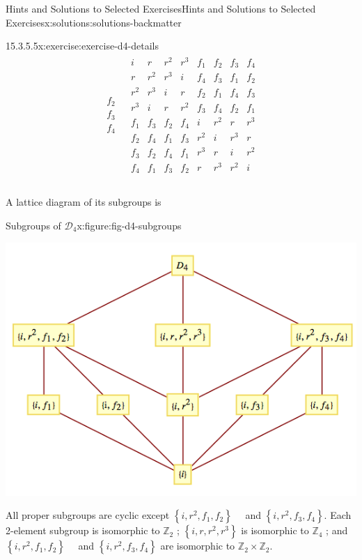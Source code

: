 \documentclass[oneside,10pt,]{book}
\numberwithin{equation}{section}
\begin{document}
\begin{solutions-chapter}{Hints and Solutions to Selected Exercises}{}{Hints and Solutions to Selected Exercises}{}{}{x:solutions:solutions-backmatter}
\begin{divisionsolution}{15.3.5.5}{}{x:exercise:exercise-d4-details}
\begin{equation*}
\begin{array}{c|c}
\begin{array}{c}
f_2 \\
f_3 \\
f_4 \\
\end{array}
& 
\begin{array}{cccccccc}
i & r & r^2 & r^3 & f_1 & f_2 & f_3 & f_4 \\
r & r^2 & r^3 & i & f_4 & f_3 & f_1 & f_2 \\
r^2 & r^3 & i & r & f_2 & f_1 & f_4 & f_3 \\
r^3 & i & r & r^2 & f_3 & f_4 & f_2 & f_1 \\
f_1 & f_3 & f_2 & f_4 & i & r^2 & r  & r^3 \\
f_2 & f_4 & f_1 & f_3 & r^2 & i & r^3 & r \\
f_3 & f_2 & f_4 & f_1 & r^3 & r & i & r^2 \\
f_4 & f_1 & f_3 & f_2 & r & r^3 & r^2 & i \\
\end{array}
\\
\end{array}
\end{equation*}
%
\par
A lattice diagram of its subgroups is%
\begin{figureptx}{Subgroups of \(\mathcal{D}_4\)}{x:figure:fig-d4-subgroups}{}%
\begin{image}{0.1}{0.8}{0.1}%
\includegraphics[width=\linewidth]{images/fig-d4-subgroups.png}
\end{image}%
\tcblower
\end{figureptx}%
All proper subgroups are cyclic except \(\left\{i,r^2,f_1,f_2\right\}\)\(\textrm{ }\textrm{ }\)and \(\left\{i,r^2,f_3,f_4\right\}\).  Each 2-element subgroup is isomorphic to \(\mathbb{Z}_2\) ; \(\left\{i,r,r^2,r^3\right\}\) is isomorphic to \(\mathbb{Z}_4\) ; and \(\left\{i,r^2,f_1,f_2\right\}\)\(\textrm{ }\textrm{ }\)and \(\left\{i,r^2,f_3,f_4\right\}\) are isomorphic to \(\mathbb{Z}_2\times \mathbb{Z}_2\).%

\end{divisionsolution}
\end{solutions-chapter}
\end{document}
